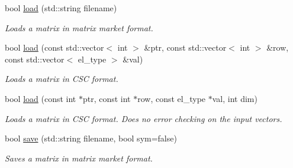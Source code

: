 \begin{DoxyCompactItemize}
bool \hyperlink{classlilc__matrix_aea5613e9a57231a6991dcf99d6d7b37a}{load} (std\+::string filename)
\begin{DoxyCompactList}\small\item\em Loads a matrix in matrix market format. \end{DoxyCompactList}\item 
bool \hyperlink{classlilc__matrix_ab469044e7f8716bc0dc4f5532e5c756a}{load} (const std\+::vector$<$ int $>$ \&ptr, const std\+::vector$<$ int $>$ \&row, const std\+::vector$<$ el\+\_\+type $>$ \&val)
\begin{DoxyCompactList}\small\item\em Loads a matrix in C\+SC format. \end{DoxyCompactList}\item 
bool \hyperlink{classlilc__matrix_a141bb846350ac12640901f50cffcf529}{load} (const int $\ast$ptr, const int $\ast$row, const el\+\_\+type $\ast$val, int dim)
\begin{DoxyCompactList}\small\item\em Loads a matrix in C\+SC format. Does no error checking on the input vectors. \end{DoxyCompactList}\item 
bool \hyperlink{classlilc__matrix_a2b0161d36019e1abac41b6119b8fa288}{save} (std\+::string filename, bool sym=false)
\begin{DoxyCompactList}\small\item\em Saves a matrix in matrix market format. \end{DoxyCompactList}\end{DoxyCompactItemize}
